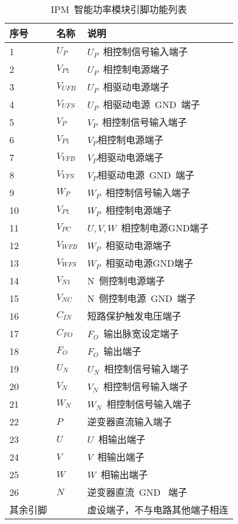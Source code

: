 \begin{table}[h]
\centering
\caption{IPM~智能功率模块引脚功能列表}
\label{tab:chap1:IPM_function}
\begin{tabular}{C{3.6cm}L{1.8cm}L{7.2cm}}
\toprule
\textbf{序号} & \textbf{名称} & \textbf{说明} \\
      & $U_P$   & $U_P$~相控制信号输入端子            \\
2      & $V_{P1}$  & $U_P$~相控制电源端子              \\
3      & $V_{UFB}$ & $U_P$~相驱动电源端子              \\
4      & $V_{UFS}$ & $U_P$~相驱动电源~GND~端子           \\
5      & $V_P$   & $V_P$~相控制信号输入端子            \\
6      & $V_{P1}$  & $V_P$相控制电源端子              \\
7      & $V_{VFB}$ & $V_P$相驱动电源端子              \\
8      & $V_{VFS}$ & $V_P$相驱动电源~GND~端子           \\
9      & $W_P$   & $W_P$~相控制信号输入端子            \\
10     & $V_{P1}$  & $W_P$~相控制电源端子              \\
11     & $V_{PC}$  & $U,V,W$~相控制电源GND端子       \\
12     & $V_{WFB}$ & $W_P$~相驱动电源端子              \\
13     & $V_{WFS}$ & $W_P$~相驱动电源GND端子           \\
14     & $V_{N1}$  & N~侧控制电源端子               \\
15     & $V_{NC}$  & N~侧控制电源~GND~端子            \\
16     & $C_{IN}$  & 短路保护触发电压端子             \\
17     & $C_{FO}$  & $F_O$~输出脉宽设定端子             \\
18     & $F_O$   & $F_O$~输出端子                 \\
19     & $U_N$   & $U_N$~相控制信号输入端子            \\
20     & $V_N$   & $V_N$~相控制信号输入端子            \\
21     & $W_N$   & $W_N$~相控制信号输入端子            \\
22     & $P$    & 逆变器直流输入端子              \\
23     & $U$  & $U$~相输出端子               \\
24     & $V$  & $V$~相输出端子               \\
25     & $W$  & $W$~相输出端子               \\
26     & $N$    & 逆变器直流~GND~ 端子             \\
其余引脚   &      & 虚设端子，不与电路其他端子相连 \\
\bottomrule
\end{tabular}
\end{table}

